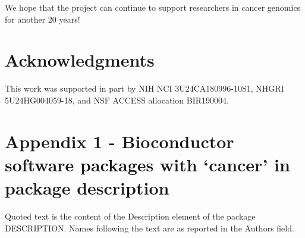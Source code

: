 \documentclass[]{article}
\begin{document}
We hope that the project can continue to support researchers in cancer
genomics for another 20 years!

\hypertarget{acknowledgments}{%
\section{Acknowledgments}\label{acknowledgments}}

This work was supported in part by NIH NCI 3U24CA180996-10S1, NHGRI 5U24HG004059-18, and NSF ACCESS allocation BIR190004.

\newpage

\hypertarget{app1}{%
\section{Appendix 1 - Bioconductor software packages with `cancer' in package description}\label{app1}}

Quoted text is the content of the Description element of the package DESCRIPTION. Names following the
text are as reported in the Authors field.
\end{document}

